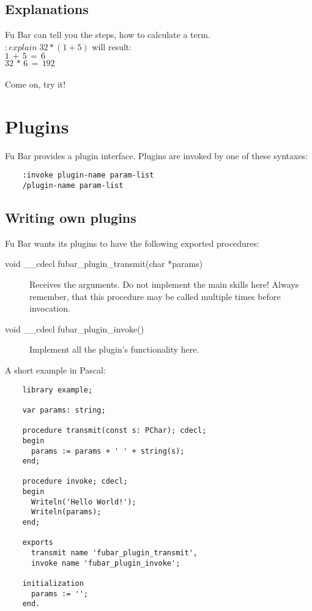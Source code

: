 \documentclass[12pt,a4paper]{article}
\begin{document}
	\subsection{Explanations}
	
	Fu Bar can tell you the steps, how to calculate a term.\\
	$:explain\;32*(1+5)$ will result:\\
	$1\,+\,5\,=\,6$\\
	$32\,*\,6\,=\,192$\\\\
	Come on, try it!
	
	\section{Plugins}
	
	Fu Bar provides a plugin interface. Plugins are invoked by one of these
	syntaxes:
	\begin{verbatim}
	:invoke plugin-name param-list
	/plugin-name param-list
	\end{verbatim}
	
	\subsection{Writing own plugins}
	
	Fu Bar wants its plugins to have the following exported procedures:
	\begin{description}
	  \item[void \_\_cdecl fubar\_plugin\_transmit(char *params)]
	    Receives the arguments. Do not implement the main skills here!
	    Always remember, that this procedure may be called multiple times
	    before invocation.
	  \item[void \_\_cdecl fubar\_plugin\_invoke()]
	    Implement all the plugin's functionality here.
	\end{description}
	
	A short example in Pascal:
	\begin{verbatim}
	library example;
	
	var params: string;
	
	procedure transmit(const s: PChar); cdecl;
	begin
	  params := params + ' ' + string(s);
	end;
	
	procedure invoke; cdecl;
	begin
	  Writeln('Hello World!');
	  Writeln(params);
	end;
	
	exports
	  transmit name 'fubar_plugin_transmit',
	  invoke name 'fubar_plugin_invoke';
	  
	initialization
	  params := '';
	end.
	\end{verbatim}
	
\end{document}
